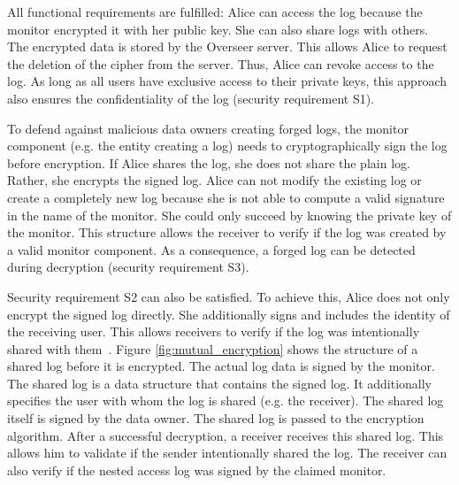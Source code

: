 \documentclass[../main.tex]{subfiles}
\begin{document}
All functional requirements are fulfilled:
Alice can access the log because the monitor encrypted it with her public key.
She can also share logs with others.
The encrypted data is stored by the Overseer server.
This allows Alice to request the deletion of the cipher from the server.
Thus, Alice can revoke access to the log.
As long as all users have exclusive access to their private keys, this approach also ensures the confidentiality of the log (security requirement S1).

To defend against malicious data owners creating forged logs, the monitor component (e.g. the entity creating a log) needs to cryptographically sign the log before encryption.
If Alice shares the log, she does not share the plain log.
Rather, she encrypts the signed log.
Alice can not modify the existing log or create a completely new log because she is not able to compute a valid signature in the name of the monitor.
She could only succeed by knowing the private key of the monitor.
This structure allows the receiver to verify if the log was created by a valid monitor component.
As a consequence, a forged log can be detected during decryption (security requirement S3).

Security requirement S2 can also be satisfied.
To achieve this, Alice does not only encrypt the signed log directly.
She additionally signs and includes the identity of the receiving user.
This allows receivers to verify if the log was intentionally shared with them~\cite{Davis2001}.
Figure \ref{fig:mutual_encryption} shows the structure of a shared log before it is encrypted.
The actual log data is signed by the monitor.
The shared log is a data structure that contains the signed log.
It additionally specifies the user with whom the log is shared (e.g. the receiver).
The shared log itself is signed by the data owner.
The shared log is passed to the encryption algorithm.
After a successful decryption, a receiver receives this shared log.
This allows him to validate if the sender intentionally shared the log.
The receiver can also verify if the nested access log was signed by the claimed monitor.
\end{document}
